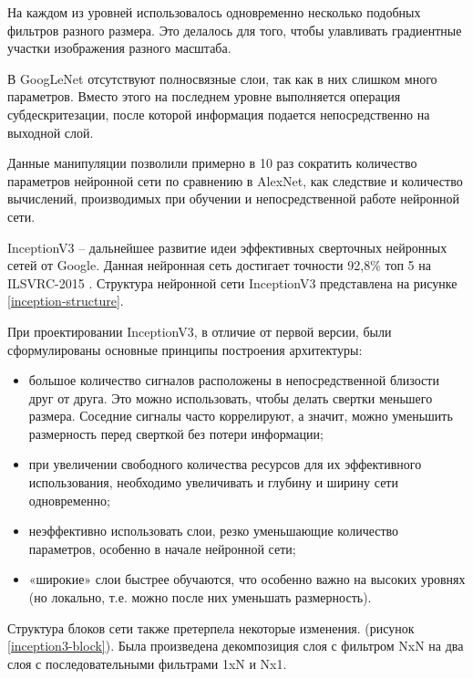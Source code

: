 На каждом из уровней использовалось одновременно несколько подобных фильтров разного размера. 
Это делалось для того, чтобы улавливать градиентные участки изображения разного масштаба.


В GoogLeNet отсутствуют полносвязные слои, так как в них слишком много параметров. 
Вместо этого на последнем уровне выполняется операция субдескритезации, после которой информация подается непосредственно на выходной слой.

Данные манипуляции позволили примерно в 10 раз сократить количество параметров нейронной сети по сравнению в AlexNet, как следствие и количество вычислений, производимых при обучении и непосредственной работе нейронной сети.

InceptionV3 – дальнейшее развитие идеи эффективных сверточных нейронных сетей от Google. Данная нейронная сеть достигает точности 92,8\% топ 5 на ILSVRC-2015 \cite{imagenet-challenge}. Структура нейронной сети InceptionV3 представлена на рисунке \ref{inception-structure}.
 

При проектировании InceptionV3, в отличие от первой версии, были сформулированы основные принципы построения архитектуры:
\begin{itemize}
    \item большое количество сигналов расположены в непосредственной близости друг от друга. Это можно использовать, чтобы делать свертки меньшего размера. Соседние сигналы часто коррелируют, а значит, можно уменьшить размерность перед сверткой без потери информации;
    \item при увеличении свободного количества ресурсов для их эффективного использования, необходимо увеличивать и глубину и ширину сети одновременно;
    \item неэффективно использовать слои, резко уменьшающие количество параметров, особенно в начале нейронной сети;
    \item «широкие» слои быстрее обучаются, что особенно важно на высоких уровнях (но локально, т.е. можно после них уменьшать размерность).
\end{itemize}

Структура блоков сети также претерпела некоторые изменения. (рисунок \ref{inception3-block}).
Была произведена декомпозиция слоя с фильтром NxN на два слоя с последовательными фильтрами 1xN и Nx1.


